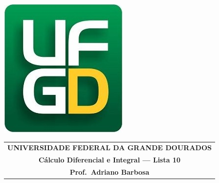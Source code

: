 \documentclass[a4paper,5pt]{amsbook}
\begin{document}
\thispagestyle{empty}
\pagestyle{empty}
\begin{minipage}[h]{0.14\textwidth}
	\includegraphics[scale=0.24]{../../ufgd.png}
\end{minipage}
\begin{minipage}[h]{\textwidth}
\begin{tabular}{c}
{{\bf UNIVERSIDADE FEDERAL DA GRANDE DOURADOS}}\\
{{\bf C\'alculo Diferencial e Integral --- Lista 10}}\\
{{\bf Prof.\ Adriano Barbosa}}\\
\end{tabular}
\vspace{-0.45cm}
%
\end{minipage}

\end{document}
